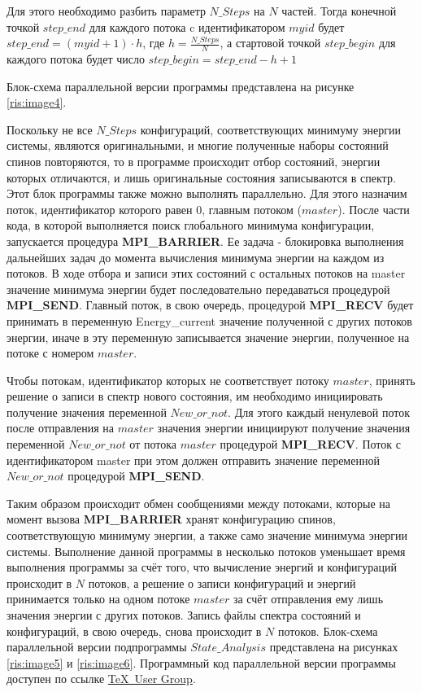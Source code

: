 \documentclass[14pt,a4paper,report]{ncc}
\begin{document}
Для этого необходимо разбить параметр $N\_Steps$ на $N$ частей. Тогда конечной точкой $step\_end$ для каждого потока c идентификатором $myid$ будет $step\_end = (myid+1)\cdot h$, где $h=\frac{N\_Steps}{N}$, а стартовой точкой $step\_begin$ для каждого потока будет число $step\_begin=step\_end - h +1$
\

Блок-схема параллельной версии программы представлена на рисунке \ref{ris:image4}.

Поскольку не все $N\_Steps$ конфигураций, соответствующих минимуму энергии системы, являются оригинальными, и многие полученные наборы состояний спинов повторяются, то в программе происходит отбор состояний, энергии которых отличаются, и лишь оригинальные состояния записываются в спектр. Этот блок программы также можно выполнять параллельно. Для этого назначим поток, идентификатор которого равен 0, главным потоком ($master$). После части кода, в которой выполняется поиск глобального минимума конфигурации, запускается процедура \textbf{MPI\_BARRIER}. Ее задача - блокировка выполнения дальнейших задач до момента вычисления минимума энергии на каждом из потоков.  В ходе отбора и записи этих состояний с остальных потоков на master значение минимума энергии будет последовательно передаваться процедурой \textbf{MPI\_SEND}. Главный поток, в свою очередь, процедурой \textbf{MPI\_RECV} будет принимать в переменную Energy\_current значение полученной с других потоков энергии, иначе в эту переменную записывается значение энергии, полученное на потоке с номером $master$. 
\

Чтобы потокам, идентификатор которых не соответствует потоку $master$, принять решение о записи в спектр нового состояния, им необходимо инициировать получение значения переменной $New\_or\_not$. Для этого каждый ненулевой поток после отправления на $master$ значения энергии инициируют получение значения переменной $New\_or\_not$ от потока $master$ процедурой \textbf{MPI\_RECV}. Поток с идентификатором master при этом должен отправить значение переменной $New\_or\_not$ процедурой \textbf{MPI\_SEND}. 
\

Таким образом происходит обмен сообщениями между потоками, которые на момент вызова \textbf{MPI\_BARRIER} хранят конфигурацию спинов, соответствующую минимуму энергии, а также само значение минимума энергии системы. Выполнение данной программы в несколько потоков уменьшает время выполнения программы за счёт того, что вычисление энергий и конфигураций происходит в $N$ потоков, а решение о записи конфигураций и энергий принимается только на одном потоке $master$ за счёт отправления ему лишь значения энергии с других потоков. Запись файлы спектра состояний и конфигураций, в свою очередь, снова происходит в $N$ потоков.
Блок-схема параллельной версии подпрограммы $State\_Analysis$ представлена на рисунках \ref{ris:image5} и \ref{ris:image6}.  Программный код параллельной версии программы доступен по ссылке \href{http://www.tug.org/}%
{\TeX\ User Group}.
\end{document}

